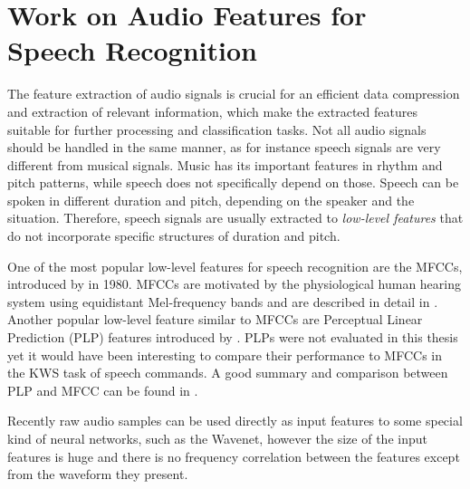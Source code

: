 
\section{Work on Audio Features for Speech Recognition}\label{sec:prev_features}
The feature extraction of audio signals is crucial for an efficient data compression and extraction of relevant information, which make the extracted features suitable for further processing and classification tasks.
Not all audio signals should be handled in the same manner, as for instance speech signals are very different from musical signals.
Music has its important features in rhythm and pitch patterns, while speech does not specifically depend on those.
Speech can be spoken in different duration and pitch, depending on the speaker and the situation.
Therefore, speech signals are usually extracted to \emph{low-level features} that do not incorporate specific structures of duration and pitch.

One of the most popular low-level features for speech recognition are the MFCCs, introduced by \cite{Mermelstein1980} in 1980.
MFCCs are motivated by the physiological human hearing system using equidistant Mel-frequency bands and are described in detail in .
Another popular low-level feature similar to MFCCs are Perceptual Linear Prediction (PLP) features introduced by \cite{Hermansky1987}.
PLPs were not evaluated in this thesis yet it would have been interesting to compare their performance to MFCCs in the KWS task of speech commands.
A good summary and comparison between PLP and MFCC can be found in \cite{Hoenig2005}.

Recently raw audio samples can be used directly as input features to some special kind of neural networks, such as the Wavenet, however the size of the input features is huge and there is no frequency correlation between the features except from the waveform they present.